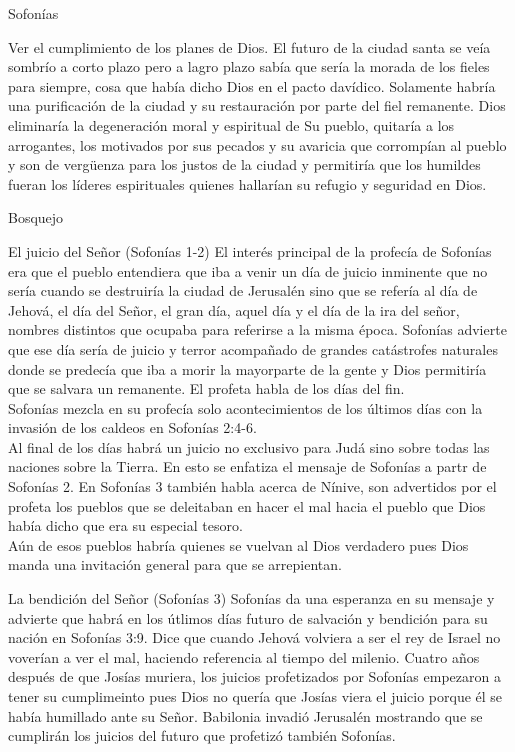 \begin{section}{Sofonías}
\begin{enumerate}
			Ver el cumplimiento de los planes de Dios. El futuro de la ciudad santa se veía sombrío a corto plazo pero a lagro plazo sabía que sería la morada de los fieles para siempre, cosa que había dicho Dios en el pacto davídico. Solamente habría una purificación de la ciudad y su restauración por parte del fiel remanente. Dios eliminaría la degeneración moral y espiritual de Su pueblo, quitaría a los arrogantes, los motivados por sus pecados y su avaricia que corrompían al pueblo y son de vergüenza para los justos de la ciudad y permitiría que los humildes fueran los líderes espirituales quienes hallarían su refugio y seguridad en Dios.\\
	\end{enumerate}
	\newpage
	\begin{subsection}{Bosquejo}
	\begin{subsubsection}{El juicio del Señor (Sofonías 1-2)}
		El interés principal de la profecía de Sofonías era que el pueblo entendiera que iba a venir un día de juicio inminente  que no sería cuando se destruiría la ciudad de Jerusalén sino que se refería al día de Jehová, el día del Señor, el gran día, aquel día y el día de la ira del señor, nombres distintos que ocupaba para referirse a la misma época. Sofonías advierte que ese día sería de juicio y terror acompañado de grandes catástrofes naturales donde se predecía que iba a morir la mayorparte de la gente y Dios permitiría que se salvara un remanente. El profeta habla de los días del fin.\\
		Sofonías mezcla en su profecía solo acontecimientos de los últimos días con la invasión de los caldeos en Sofonías 2:4-6.\\
		Al final de los días habrá un juicio no exclusivo para Judá sino sobre todas las naciones sobre la Tierra. En esto se enfatiza el mensaje de Sofonías a partr de Sofonías 2. En Sofonías 3 también habla acerca de Nínive, son advertidos por el profeta los pueblos que se deleitaban en hacer el mal hacia el pueblo que Dios había dicho que era su especial tesoro.\\
		Aún de esos pueblos habría quienes se vuelvan al Dios verdadero pues Dios manda una invitación general para que se arrepientan.
	\end{subsubsection}
	\begin{subsubsection}{La bendición del Señor (Sofonías 3)}
		Sofonías da una esperanza en su mensaje y advierte que habrá en los útlimos días futuro de salvación y bendición para su nación en Sofonías 3:9. Dice que cuando Jehová volviera a ser el rey de Israel no voverían a ver el mal, haciendo referencia al tiempo del milenio. Cuatro años después de que Josías muriera, los juicios profetizados por Sofonías empezaron a tener su cumplimeinto pues Dios no quería que Josías viera el juicio porque él se había humillado ante su Señor. Babilonia invadió Jerusalén mostrando que se cumplirán los juicios del futuro que profetizó también Sofonías.
	\end{subsubsection}
	\end{subsection}
\end{section}
%


